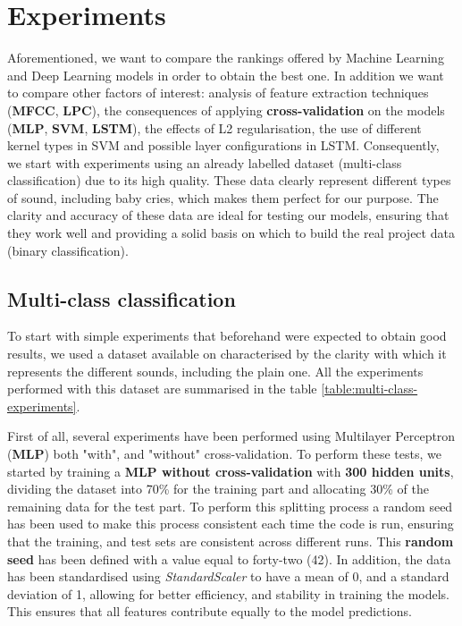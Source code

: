 \section{Experiments}

Aforementioned, we want to compare the rankings offered by Machine Learning and Deep Learning models in order to obtain the best one. In addition we want to compare other factors of interest: analysis of feature extraction techniques (\textbf{MFCC}, \textbf{LPC}), the consequences of applying \textbf{cross-validation} on the models (\textbf{MLP}, \textbf{SVM}, \textbf{LSTM}), the effects of L2 regularisation, the use of different kernel types in SVM and possible layer configurations in LSTM. Consequently, we start with experiments using an already labelled dataset (multi-class classification) due to its high quality. These data clearly represent different types of sound, including baby cries, which makes them perfect for our purpose. The clarity and accuracy of these data are ideal for testing our models, ensuring that they work well and providing a solid basis on which to build the real project data (binary classification). 

\subsection{Multi-class classification}

To start with simple experiments that beforehand were expected to obtain good results, we used a dataset available on  characterised by the clarity with which it represents the different sounds, including the plain one. All the experiments performed with this dataset are summarised in the table \ref{table:multi-class-experiments}.

First of all, several experiments have been performed using Multilayer Perceptron (\textbf{MLP}) both "with", and "without" cross-validation. To perform these tests, we started by training a \textbf{MLP without cross-validation} with \textbf{300 hidden units}, dividing the dataset into 70\% for the training part and allocating 30\% of the remaining data for the test part. To perform this splitting process a random seed has been used to make this process consistent each time the code is run, ensuring that the training, and test sets are consistent across different runs. This \textbf{random seed} has been defined with a value equal to forty-two (42). In addition, the data has been standardised using \textit{StandardScaler} to have a mean of 0, and a standard deviation of 1, allowing for better efficiency, and stability in training the models. This ensures that all features contribute equally to the model predictions.

